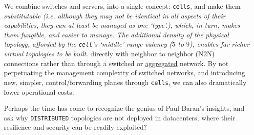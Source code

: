 We combine switches and servers, into a single concept:  \texttt{cells}, and make them \emph{substitutable (i.e. although they may not be identical in all aspects of their capabilities, they can at least be managed as one `type'.), which, in turn, makes them \emph{fungible}, and easier to manage. The additional density of the physical topology, afforded by the \texttt{cell}'s  `middle' range valency ($5$ to $9$), enables far richer virtual topologies to be built.} directly with neighbor to neighbor (N2N) %
connections rather than through a switched or \href{http://www.plexxi.com/2013/07/the-problem-with-everything-in-aggregation/}{aggregated} network. By not perpetuating the management complexity of switched networks, and introducing new, simpler, control/forwarding planes through \texttt{cells}, we can also dramatically lower  operational costs. 




\begin{highlightbox}
\noindent Perhaps the time has come to recognize the genius of Paul Baran's insights, and ask why \texttt{DISTRIBUTED} topologies are not deployed in datacenters, where their resilience and security can be readily exploited?
\end{highlightbox}

